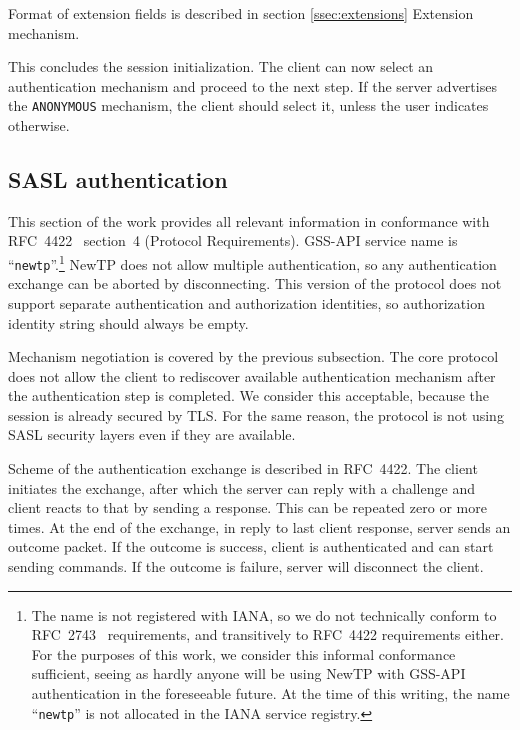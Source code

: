 Format of extension fields is described in section \ref{ssec:extensions} Extension mechanism.

This concludes the session initialization. The client can now select an authentication mechanism and proceed
to the next step. If the server advertises the {\tt ANONYMOUS} mechanism, the client should select it, unless
the user indicates otherwise.

%

\subsection{SASL authentication}

This section of the work provides all relevant information in conformance with RFC~4422~\cite{rfc4422}
section~4 (Protocol Requirements). GSS-API service name is ``{\tt newtp}''.\footnote{The name is not
registered with IANA, so we do not technically conform to RFC~2743~\cite{rfc2743} requirements, and
transitively to RFC~4422 requirements either. For the purposes of this work, we consider this informal
conformance sufficient, seeing as hardly anyone will be using NewTP with GSS-API authentication in the
foreseeable future. At the time of this writing, the name ``{\tt newtp}'' is not allocated in the IANA service
registry.} NewTP does not allow multiple authentication, so any authentication exchange can be aborted by
disconnecting. This version of the protocol does not support separate authentication and authorization
identities, so authorization identity string should always be empty.

Mechanism negotiation is covered by the previous subsection. The core protocol does not allow the client to
rediscover available authentication mechanism after the authentication step is completed. We consider this
acceptable, because the session is already secured by TLS. For the same reason, the protocol is not using SASL
security layers even if they are available.

Scheme of the authentication exchange is described in RFC~4422. The client initiates the exchange, after which
the server can reply with a challenge and client reacts to that by sending a response. This can be repeated
zero or more times. At the end of the exchange, in reply to last client response, server sends an outcome
packet.  If the outcome is success, client is authenticated and can start sending commands. If the outcome is
failure, server will disconnect the client.

